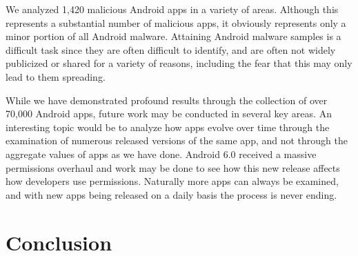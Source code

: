 \documentclass{sig-alternate-05-2015}
\begin{document}
We analyzed 1,420 malicious Android apps in a variety of areas. Although this represents a substantial number of malicious apps, it obviously represents only a minor portion of all Android malware. Attaining Android malware samples is a difficult task since they are often difficult to identify, and are often not widely publicized or shared for a variety of reasons, including the fear that this may only lead to them spreading.



While we have demonstrated profound results through the collection of over 70,000 Android apps, future work may be conducted in several key areas. An interesting topic would be to analyze how apps evolve over time through the examination of numerous released versions of the same app, and not through the aggregate values of apps as we have done. Android 6.0 received a massive permissions overhaul and work may be done to see how this new release affects how developers use permissions. Naturally more apps can always be examined, and with new apps being released on a daily basis the process is never ending.











\section{Conclusion}
\label{sec: conclusion}
\end{document}
